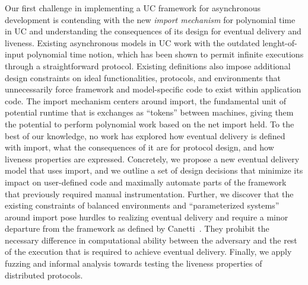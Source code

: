 Our first challenge in implementing a UC framework for asynchronous development
is contending with the new \emph{import mechanism} for polynomial time in UC
and understanding the consequences of its design for eventual delivery and
liveness.  Existing asynchronous models in UC work with the outdated
lenght-of-input polynomial time notion, which has been shown to permit infinite
executions through a straightforward protocol.  Existing definitions also
impose additional design constraints on ideal functionalities, protocols, and
environments that unnecessarily force framework and model-specific code to
exist within application code.  The import mechanism centers around import, the
fundamental unit of potential runtime that is exchanges as ``tokens'' between
machines, giving them the potential to perform polynomial work based on the net
import held.  To the best of our knowledge, no work has explored how eventual
delivery is defined with import, what the consequences of it are for protocol
design, and how liveness properties are expressed.  Concretely, we propose a
new eventual delivery model that uses import, and we outline a set of design
decisions that minimize its impact on user-defined code and maximally automate
parts of the framework that previously required manual instrumentation.
Further, we discover that the existing constraints of balanced environments and
``parameterized systems'' around import pose hurdles to realizing eventual
delivery and require a minor departure from the framework as defined by
Canetti~\cite{uc}.  They prohibit the necessary difference in computational
ability between the adversary and the rest of the execution that is required to
achieve eventual delivery.  Finally, we apply fuzzing and informal analysis
towards testing the liveness properties of distributed protocols.

